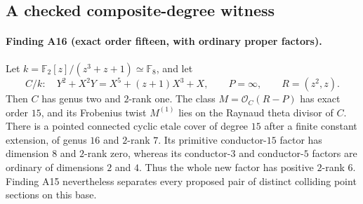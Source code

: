 \subsection{A checked composite-degree witness}

\paragraph{Finding A16 (exact order fifteen, with ordinary proper factors).}
Let $k=\mathbb F_2[z]/(z^3+z+1)\simeq\mathbb F_8$, and let
\[
 C/k:\quad Y^2+X^2Y=X^5+(z+1)X^3+X,\qquad
 P=\infty,\qquad R=(z^2,z).
 \tag{CE.1}
\]
Then $C$ has genus two and $2$-rank one. The class
$M=\mathcal O_C(R-P)$ has exact order $15$, and its Frobenius twist
$M^{(1)}$ lies on the Raynaud theta divisor of $C$.
There is a pointed connected cyclic etale cover of degree $15$
after a finite constant extension, of genus $16$ and $2$-rank $7$.
Its primitive conductor-$15$ factor has dimension $8$ and $2$-rank
zero, whereas its conductor-$3$ and conductor-$5$ factors are
ordinary of dimensions $2$ and $4$. Thus the whole new factor has
positive $2$-rank $6$. Finding A15 nevertheless separates every
proposed pair of distinct colliding point sections on this base.

